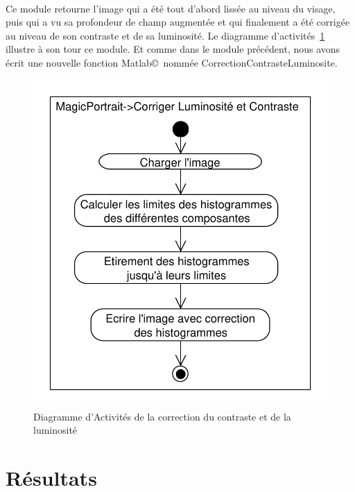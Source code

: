 \documentclass[11pt, french,screen]{report-rd-info}
\begin{document}
\paragraph*{}
Ce module retourne l'image qui a été tout d'abord lissée au niveau du visage, puis qui a vu sa profondeur de champ augmentée et qui finalement a été corrigée au niveau de son contraste et de sa luminosité. Le diagramme d'activités~\ref{diag:diagramme30} illustre à son tour ce module. Et comme dans le module précédent, nous avons écrit une nouvelle fonction Matlab\copyright~nommée CorrectionContrasteLuminosite.

\begin{figure}
\centering
\includegraphics[scale=0.5]{Diagrammes/DiagrammeActivites_30_Contraste}
\caption{Diagramme d'Activités de la correction du contraste et de la luminosité}
\label{diag:diagramme30}
\end{figure}



\section{Résultats}
\end{document}
